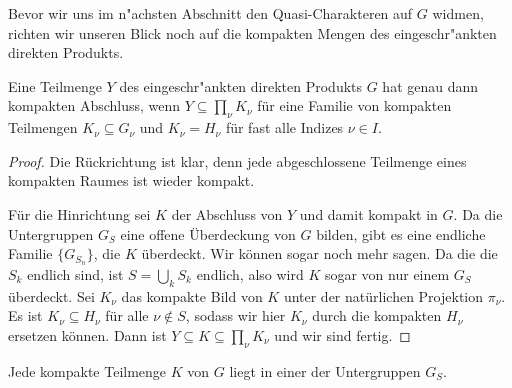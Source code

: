 		Bevor wir uns im n"achsten Abschnitt den Quasi-Charakteren auf $G$ widmen, richten wir unseren Blick noch auf die kompakten Mengen des eingeschr"ankten direkten Produkts.
		\begin{satz}%
			Eine Teilmenge $Y$ des eingeschr"ankten direkten Produkts $G$ hat genau dann kompakten Abschluss, wenn $Y \subseteq \prod_\nu{K_\nu}$ für eine Familie von kompakten Teilmengen $K_\nu \subseteq G_\nu$ und $K_\nu = H_\nu$ für fast alle Indizes $\nu\in I$.
		\end{satz}
		\begin{proof}
			Die Rückrichtung ist klar, denn jede abgeschlossene Teilmenge eines kompakten Raumes ist wieder kompakt. 

			Für die Hinrichtung sei $K$ der Abschluss von $Y$ und damit kompakt in $G$. 
			Da die Untergruppen $G_S$ eine offene Überdeckung von $G$ bilden, gibt es eine endliche Familie $\{G_{S_n}\}$, die $K$ überdeckt. 
			Wir können sogar noch mehr sagen. 
			Da die die $S_k$ endlich sind, ist $S = \bigcup_k S_k$ endlich, also wird $K$ sogar von nur einem $G_S$ überdeckt. 
			Sei $K_\nu$ das kompakte Bild von $K$ unter der natürlichen Projektion $\pi_\nu$. 
			Es ist $K_\nu \subseteq H_\nu$ für alle $\nu\notin S$, sodass wir hier $K_\nu$ durch die kompakten $H_\nu$ ersetzen können. 
			Dann ist $Y\subseteq K \subseteq \prod_\nu{K_\nu}$ und wir sind fertig.
		\end{proof}
		\begin{korollar}\label{kor:rdp:kompakt}
			Jede kompakte Teilmenge $K$ von $G$ liegt in einer der Untergruppen $G_S$.
		\end{korollar}
 

